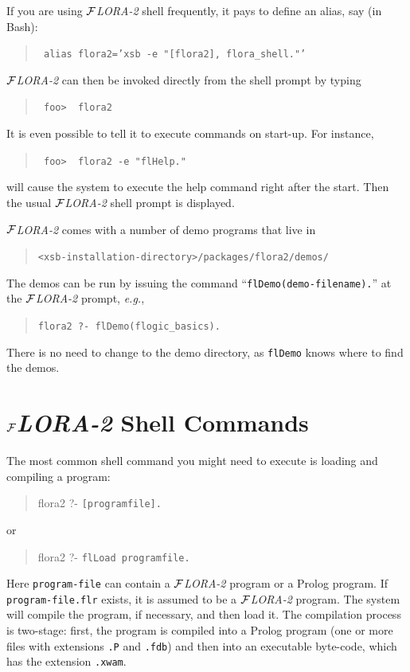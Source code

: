 \documentclass[11pt]{article}
\newcommand{\FLORA}{{\mbox{${\cal F}${\small\it LORA}\rm\emph{-2}}}\xspace}
\newcommand{\ofile}{xwam}
\begin{document}
\noindent
If you are using \FLORA shell frequently, it pays to define an alias, say
(in Bash):
\begin{quote}
 {\tt
   alias flora2='xsb -e "[flora2], flora\_shell."'
   }
\end{quote}
\FLORA can then be invoked directly from the shell prompt by typing
\begin{quote}
  \tt
foo>~~flora2
\end{quote}
It is even possible to tell it to execute commands on start-up.
For instance, 
\begin{quote}
 \tt
 foo>~~flora2 -e "flHelp."
\end{quote}
will cause the system to execute the help command right after the start.
Then the usual \FLORA shell prompt is displayed.

\noindent
\FLORA comes with a number of demo programs that live in
\begin{quote}
 \verb|<xsb-installation-directory>/packages/flora2/demos/|  
\end{quote}
The demos can be run by issuing the command
``\verb|flDemo(demo-filename).|''
at the \FLORA prompt, {\it e.g.},
\begin{quote}
 \verb|flora2 ?- flDemo(flogic_basics).|
\end{quote}
There is no need to change to the demo directory, as {\tt flDemo} knows
where to find the demos.


\section{\FLORA Shell Commands} \label{sec-shell-commands}

The most common shell command you might need to execute is loading and
compiling a program:
\begin{quote}
  flora2 ?-  {\tt [programfile].}
\end{quote}
or 
\begin{quote}
  flora2 ?- {\tt flLoad programfile.}
\end{quote}
Here {\tt program-file} can contain a \FLORA program or a Prolog program. If
{\tt program-file.flr} exists, it is assumed to be a \FLORA program. The
system will compile the program, if necessary, and then load it. The
compilation process is two-stage: first, the program is compiled into a
Prolog program (one or more files with extensions {\tt .P} and {\tt .fdb})
and then into an executable byte-code, which has the extension {\tt .\ofile}.
\end{document}
